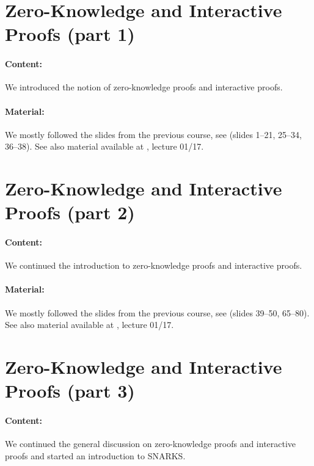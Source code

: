 \documentclass{llncs}
\begin{document}
\section{Zero-Knowledge and Interactive Proofs (part 1)}

\paragraph{Content:} We introduced the notion of zero-knowledge proofs and interactive proofs.

\paragraph{Material:}   We mostly followed the slides from the previous course, see \cite{ZK} (slides 1--21, 25--34, 36--38). See also material available at \cite{ZKlearning}, lecture 01/17.


\section{Zero-Knowledge and Interactive Proofs (part 2)}

\paragraph{Content:} 
We continued the introduction to zero-knowledge proofs and interactive proofs.

\paragraph{Material:} We mostly followed the slides from the previous course, see \cite{ZK}  (slides 39--50, 65--80). See also material available at \cite{ZKlearning}, lecture 01/17.





\section{Zero-Knowledge and Interactive Proofs (part 3)}

\paragraph{Content:} 
We continued the general discussion on zero-knowledge proofs and interactive proofs and started an introduction to SNARKS.
\end{document}

